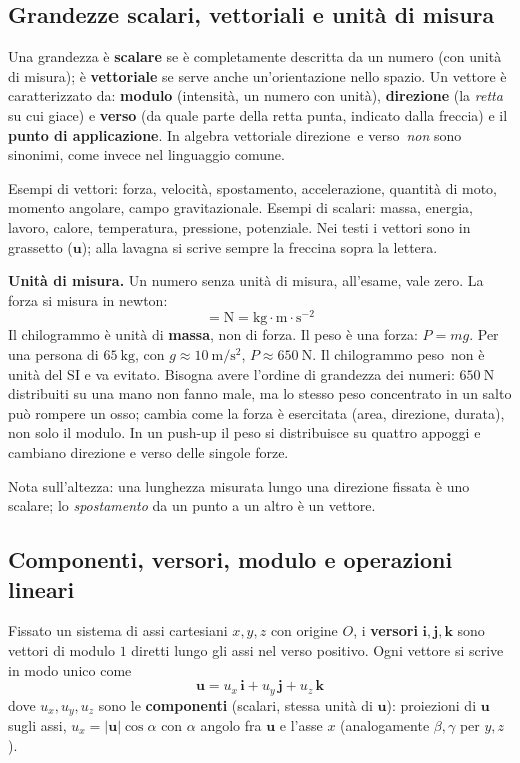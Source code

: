 \documentclass[11pt,a4paper]{article}
\newcommand{\vv}[1]{\mathbf{#1}}
\newcommand{\mo}[1]{\left|#1\right|}
\newcommand{\unit}[1]{\ \mathrm{#1}}
\begin{document}
\subsection{Grandezze scalari, vettoriali e unità di misura}
\begin{richiamo}
Una grandezza è \textbf{scalare} se è completamente descritta da un numero (con unità di misura); è \textbf{vettoriale} se serve anche un'orientazione nello spazio. Un vettore è caratterizzato da: \textbf{modulo} (intensità, un numero con unità), \textbf{direzione} (la \emph{retta} su cui giace) e \textbf{verso} (da quale parte della retta punta, indicato dalla freccia) e il \textbf{punto di applicazione}. In algebra vettoriale \guillemotleft direzione\guillemotright\ e \guillemotleft verso\guillemotright\ \emph{non} sono sinonimi, come invece nel linguaggio comune.
\end{richiamo}

Esempi di vettori: forza, velocità, spostamento, accelerazione, quantità di moto, momento angolare, campo gravitazionale. Esempi di scalari: massa, energia, lavoro, calore, temperatura, pressione, potenziale. Nei testi i vettori sono in grassetto ($\vv u$); alla lavagna si scrive sempre la freccina sopra la lettera.

\textbf{Unità di misura.} Un numero senza unità di misura, all'esame, vale zero. La forza si misura in newton:
\begin{equation}
[F]=\mathrm{N}=\mathrm{kg\cdot m\cdot s^{-2}}
\end{equation}
Il chilogrammo è unità di \textbf{massa}, non di forza. Il peso è una forza: $P=mg$. Per una persona di $65\unit{kg}$, con $g\approx10\unit{m/s^2}$, $P\approx650\unit{N}$. Il \guillemotleft chilogrammo peso\guillemotright\ non è unità del SI e va evitato. Bisogna avere l'ordine di grandezza dei numeri: $650\unit{N}$ distribuiti su una mano non fanno male, ma lo stesso peso concentrato in un salto può rompere un osso; cambia come la forza è esercitata (area, direzione, durata), non solo il modulo. In un push-up il peso si distribuisce su quattro appoggi e cambiano direzione e verso delle singole forze.

Nota sull'altezza: una lunghezza misurata lungo una direzione fissata è uno scalare; lo \emph{spostamento} da un punto a un altro è un vettore.

\subsection{Componenti, versori, modulo e operazioni lineari}
Fissato un sistema di assi cartesiani $x,y,z$ con origine $O$, i \textbf{versori} $\vv i,\vv j,\vv k$ sono vettori di modulo $1$ diretti lungo gli assi nel verso positivo. Ogni vettore si scrive in modo unico come
\begin{equation}
\vv u=u_x\,\vv i+u_y\,\vv j+u_z\,\vv k
\end{equation}
dove $u_x,u_y,u_z$ sono le \textbf{componenti} (scalari, stessa unità di $\vv u$): proiezioni di $\vv u$ sugli assi, $u_x=\mo{\vv u}\cos\alpha$ con $\alpha$ angolo fra $\vv u$ e l'asse $x$ (analogamente $\beta,\gamma$ per $y,z$).
\end{document}
